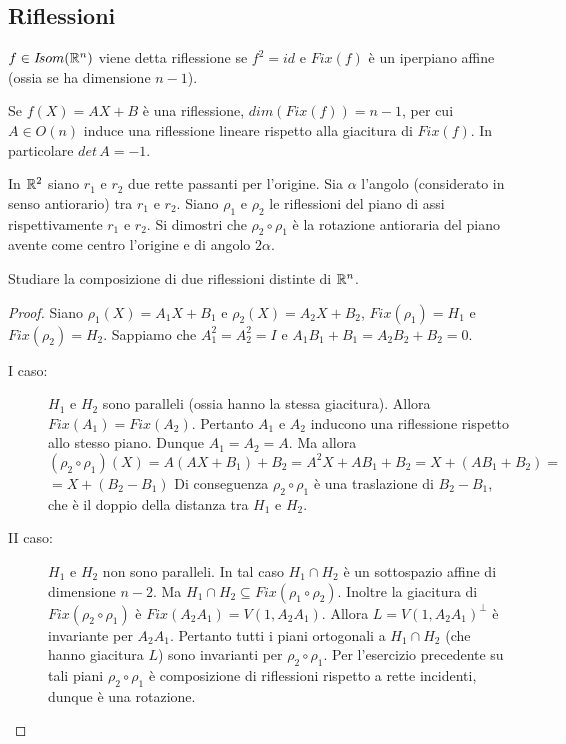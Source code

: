 	\subsection{Riflessioni}
 
 \begin{definition}
	$f\in I\!som( \mathbb R^n )$ viene detta riflessione se $f^2=id$ e $Fix(f)$ 
	è un iperpiano affine (ossia se ha dimensione $n-1$).
 \end{definition}

 
 \begin{remark}
 Se $f(X)=AX+B$ è una riflessione, $dim(Fix(f))=n-1$, per cui
 $A\in O(n)$ induce una riflessione lineare rispetto alla giacitura di $Fix(f)$. In particolare $det\,A=-1$.
 \end{remark}
 
 \begin{exercise}
In $\mathbb R^2$ siano $r_1$ e $r_2$ due rette passanti per l'origine. Sia $\alpha$
 l'angolo (considerato in senso antiorario) tra $r_1$ e $r_2$. Siano $\rho_1$ e $\rho_2$
 le riflessioni del piano di assi rispettivamente $r_1$ e $r_2$.
 Si dimostri che $\rho_2\circ\rho_1$ è la rotazione antioraria del piano avente come centro l'origine e di angolo 
 $2\alpha$.
 \end{exercise}
 
 \begin{exercise}
 Studiare la composizione di due riflessioni distinte di $\mathbb R^n$.
 \end{exercise}
 
 \begin{proof}
Siano $\rho_1(X)=A_1X+B_1$ e $\rho_2(X)=A_2X+B_2$, $Fix(\rho_1)=H_1$ e
 $Fix(\rho_2)=H_2$. 
 Sappiamo che $A_1^2=A_2^2=I$ e $A_1B_1+B_1=A_2B_2+B_2=0$.
 
 \begin{description}
	\item[I caso:] $H_1$ e $H_2$ sono paralleli (ossia hanno la stessa giacitura).
		Allora $Fix(A_1)=Fix(A_2)$. Pertanto $A_1$ e $A_2$ inducono una riflessione rispetto allo stesso piano.
		Dunque $A_1=A_2=A$.
		Ma allora $(\rho_2\circ\rho_1)(X)=A(AX+B_1)+B_2=A^2X+AB_1+B_2=X+(AB_1+B_2)=$
		$=X+(B_2-B_1)$
		Di conseguenza $\rho_2\circ\rho_1$ è una traslazione di $B_2-B_1$, che è il doppio della distanza tra
		$H_1$ e $H_2$.
	\item[II caso: ] $H_1$ e $H_2$ non sono paralleli.
		In tal caso $H_1\cap H_2$ è un sottospazio affine di dimensione $n-2$.
		Ma $H_1\cap H_2\subseteq Fix(\rho_1\circ\rho_2)$.
		Inoltre la giacitura di $Fix(\rho_2\circ\rho_1)$ è
		$Fix(A_2A_1)=V(1,A_2A_1)$. Allora $L=V(1,A_2A_1)^{\bot}$ è invariante per $A_2A_1$.
		Pertanto tutti i piani ortogonali a $H_1\cap H_2$ (che hanno giacitura $L$) sono invarianti per
		$\rho_2\circ\rho_1$.
		Per l'esercizio precedente su tali piani $\rho_2\circ\rho_1$ è composizione di riflessioni rispetto a rette incidenti,
		dunque è una rotazione.
 \end{description}
 
 \end{proof}
 
